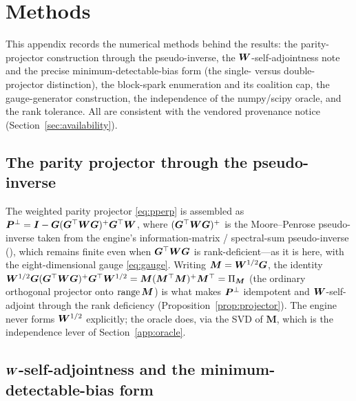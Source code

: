 \section{Methods}
\label{app:methods}

This appendix records the numerical methods behind the results: the parity-projector
construction through the pseudo-inverse, the $\bm{W}$-self-adjointness note and the precise
minimum-detectable-bias form (the single- versus double-projector distinction), the
block-spark enumeration and its coalition cap, the gauge-generator construction, the
independence of the numpy/scipy oracle, and the rank tolerance. All are consistent with the
vendored provenance notice (Section~\ref{sec:availability}).

\subsection{The parity projector through the pseudo-inverse}
\label{app:projector}

The weighted parity projector \eqref{eq:pperp} is assembled as $\bm{P}^{\perp}=\bm{I}-\bm{G}
(\bm{G}^\top\bm{W}\bm{G})^{+}\bm{G}^\top\bm{W}$, where $(\bm{G}^\top\bm{W}\bm{G})^{+}$ is the
Moore--Penrose pseudo-inverse taken from the engine's information-matrix / spectral-sum
pseudo-inverse (), which remains finite even when $\bm{G}^\top\bm{W}\bm{G}$ is
rank-deficient---as it is here, with the eight-dimensional gauge \eqref{eq:gauge}. Writing
$\bm M=\bm{W}^{1/2}\bm{G}$, the identity $\bm{W}^{1/2}\bm{G}(\bm{G}^\top\bm{W}\bm{G})^{+}\bm{G}^\top
\bm{W}^{1/2}=\bm M(\bm M^\top\bm M)^{+}\bm M^\top=\Pi_{\bm M}$ (the ordinary orthogonal
projector onto $\operatorname{range}\bm M$) is what makes $\bm{P}^{\perp}$ idempotent and $\bm{W}$-self-adjoint through
the rank deficiency (Proposition~\ref{prop:projector}). The engine never forms $\bm{W}^{1/2}$
explicitly; the oracle does, via the SVD of $\bm M$, which is the independence lever of
Section~\ref{app:oracle}.

\subsection{\texorpdfstring{$\bm{W}$}{W}-self-adjointness and the minimum-detectable-bias form}
\label{app:mdb}

